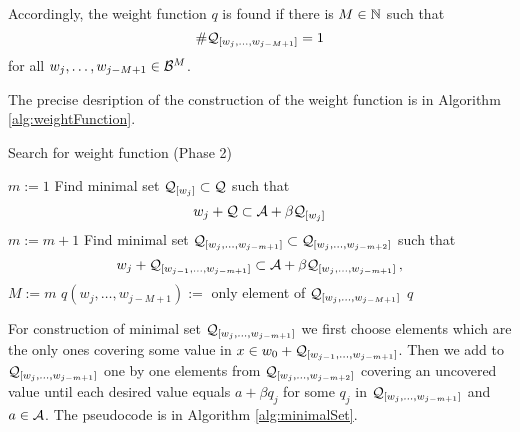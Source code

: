     Accordingly, the weight function $q$ is found if there is $M\in\mathbb{N}$ such that 
    $$
    \#\mathcal{Q}_{[w_{j},\dots, w_{j-M+1}]}=1
    $$
    for all $w_{j},\dots, w_{j-M+1} \in \mathcal{B}^M$.
    
    The precise desription of the construction of the weight function is in  Algorithm \ref{alg:weightFunction}.
\begin{algorithm}
  \caption{Search for weight function (Phase 2)}
    \label{alg:weightFunction}
  \begin{algorithmic}
    \STATE $m:=1$
        \STATE Find minimal set $\mathcal{Q}_{[w_j]} \subset \mathcal{Q}$ such that
          $$
          w_j + \mathcal{Q} \subset \mathcal{A} + \beta \mathcal{Q}_{[w_j]}
          $$
    \ENDFOR
        \STATE $m:= m +1$
            \STATE Find minimal set $\mathcal{Q}_{[w_j,\dots, w_{j-m+1}]} \subset \mathcal{Q}_{[w_j,\dots, w_{j-m+2}]}$ such that
              $$
              w_j + \mathcal{Q}_{[w_{j-1},\dots, w_{j-m+1}]} \subset \mathcal{A} + \beta \mathcal{Q}_{[w_j,\dots, w_{j-m+1}]}\,,
              $$
        \ENDFOR  
    \ENDWHILE  
    \STATE $M:= m$ 
        \STATE $q(w_j,\dots, w_{j-M+1}):=$ only element of $\mathcal{Q}_{[w_j,\dots, w_{j-M+1}]}$
    \ENDFOR
    \RETURN $q$
  \end{algorithmic}
\end{algorithm}
    
For construction of minimal set $\mathcal{Q}_{[w_j,\dots, w_{j-m+1}]}$ we first choose elements which are the only ones covering some value in $x \in w_0 + \mathcal{Q}_{[w_{j-1},\dots, w_{j-m+1}]}$. Then we add to $\mathcal{Q}_{[w_j,\dots, w_{j-m+1}]}$ one by one elements from $\mathcal{Q}_{[w_j,\dots, w_{j-m+2}]}$ covering an uncovered value until each desired value equals $a+\beta q_j$ for some $q_j$ in $\mathcal{Q}_{[w_j,\dots, w_{j-m+1}]}$ and $a\in\mathcal{A}$. The pseudocode is in Algorithm \ref{alg:minimalSet}.

